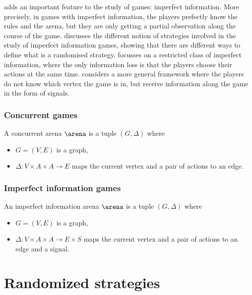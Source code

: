  adds an important feature to the study of games: imperfect information.
More precisely, in games with imperfect information, the players prefectly know the rules and the arena, but they
are only getting a partial observation along the course of the game.
 discusses the different notion of strategies involved in the study of imperfect information games,
showing that there are different ways to define what is a randomised strategy.
 focusses on a restricted class of imperfect information, where the only information loss
is that the players choose their actions at the same time.
 considers a more general framework where the players do not know which vertex the game is in,
but receive information along the game in the form of signals.

\subsubsection*{Concurrent games}

\begin{definition}
A concurrent arena $\arena$ is a tuple $(G,\Delta)$ where 
\begin{itemize}
	\item $G = (V,E)$ is a graph,
	\item $\Delta : V \times A \times A \to E$ maps the current vertex and a pair of actions to an edge.
\end{itemize}
\end{definition}

\subsubsection*{Imperfect information games}

\begin{definition}
An imperfect information arena $\arena$ is a tuple $(G,\Delta)$ where 
\begin{itemize}
	\item $G = (V,E)$ is a graph,
	\item $\Delta : V \times A \times A \to E \times S$ maps the current vertex and a pair of actions to an edge
	and a signal.
\end{itemize}
\end{definition}

\section*{Randomized strategies}
